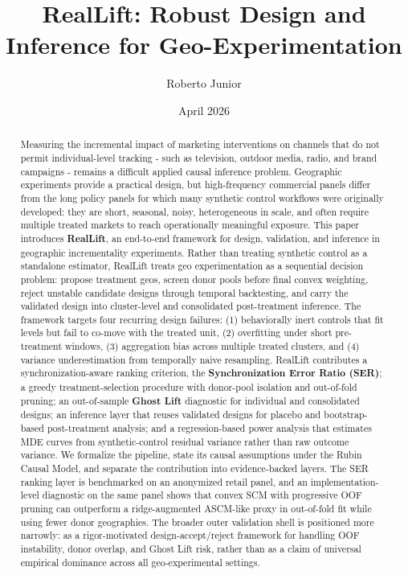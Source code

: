 \documentclass[11pt]{article}
\title{RealLift: Robust Design and Inference for Geo-Experimentation}
\author{Roberto Junior}
\date{April 2026}
\begin{document}
\maketitle
\thispagestyle{firstpageinfo}

\begin{abstract}
Measuring the incremental impact of marketing interventions on channels that do not permit individual-level tracking - such as television, outdoor media, radio, and brand campaigns - remains a difficult applied causal inference problem. Geographic experiments provide a practical design, but high-frequency commercial panels differ from the long policy panels for which many synthetic control workflows were originally developed: they are short, seasonal, noisy, heterogeneous in scale, and often require multiple treated markets to reach operationally meaningful exposure. This paper introduces \textbf{RealLift}, an end-to-end framework for design, validation, and inference in geographic incrementality experiments. Rather than treating synthetic control as a standalone estimator, RealLift treats geo experimentation as a sequential decision problem: propose treatment geos, screen donor pools before final convex weighting, reject unstable candidate designs through temporal backtesting, and carry the validated design into cluster-level and consolidated post-treatment inference. The framework targets four recurring design failures: (1) behaviorally inert controls that fit levels but fail to co-move with the treated unit, (2) overfitting under short pre-treatment windows, (3) aggregation bias across multiple treated clusters, and (4) variance underestimation from temporally naive resampling. RealLift contributes a synchronization-aware ranking criterion, the \textbf{Synchronization Error Ratio (SER)}; a greedy treatment-selection procedure with donor-pool isolation and out-of-fold pruning; an out-of-sample \textbf{Ghost Lift} diagnostic for individual and consolidated designs; an inference layer that reuses validated designs for placebo and bootstrap-based post-treatment analysis; and a regression-based power analysis that estimates MDE curves from synthetic-control residual variance rather than raw outcome variance. We formalize the pipeline, state its causal assumptions under the Rubin Causal Model, and separate the contribution into evidence-backed layers. The SER ranking layer is benchmarked on an anonymized retail panel, and an implementation-level diagnostic on the same panel shows that convex SCM with progressive OOF pruning can outperform a ridge-augmented ASCM-like proxy in out-of-fold fit while using fewer donor geographies. The broader outer validation shell is positioned more narrowly: as a rigor-motivated design-accept/reject framework for handling OOF instability, donor overlap, and Ghost Lift risk, rather than as a claim of universal empirical dominance across all geo-experimental settings.
\end{abstract}
\end{document}
